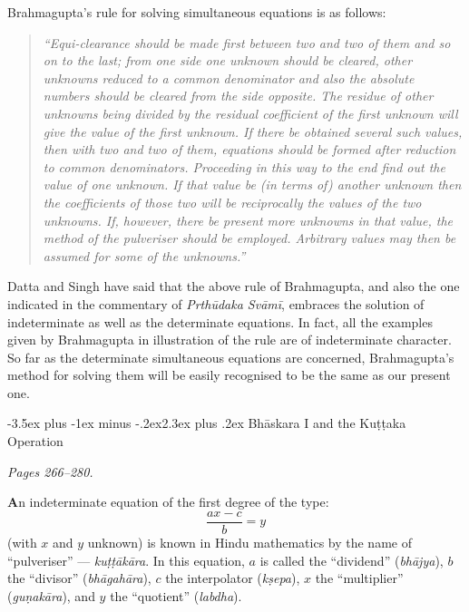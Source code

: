 \documentclass[11pt,a4paper]{article}
\makeatletter
\renewcommand{\section}{\@startsection {section}{1}{\z@}%
  {-3.5ex plus -1ex minus -.2ex}{2.3ex plus .2ex}%
  {\normalfont\Large\bfseries\color{sectioncolor}}}
\newcommand{\cnote}[1]{\textcolor{notecolor}{\textit{#1}}}
\makeatother
\begin{document}
Brahmagupta's rule for solving simultaneous equations is as follows:

\begin{quote}
\textit{``Equi-clearance should be made first between two and two of them and so on to the last; from one side one unknown should be cleared, other unknowns reduced to a common denominator and also the absolute numbers should be cleared from the side opposite. The residue of other unknowns being divided by the residual coefficient of the first unknown will give the value of the first unknown. If there be obtained several such values, then with two and two of them, equations should be formed after reduction to common denominators. Proceeding in this way to the end find out the value of one unknown. If that value be (in terms of) another unknown then the coefficients of those two will be reciprocally the values of the two unknowns. If, however, there be present more unknowns in that value, the method of the pulveriser should be employed. Arbitrary values may then be assumed for some of the unknowns.''}
\end{quote}

Datta and Singh have said that the above rule of Brahmagupta, and also the one indicated in the commentary of \textit{Prthūdaka Svāmī}, embraces the solution of indeterminate as well as the determinate equations. In fact, all the examples given by Brahmagupta in illustration of the rule are of indeterminate character. So far as the determinate simultaneous equations are concerned, Brahmagupta's method for solving them will be easily recognised to be the same as our present one.

\section{Bhāskara I and the Kuṭṭaka Operation}
\label{sec:kuttaka}

\cnote{Pages 266--280.}

\textbf{A}n indeterminate equation of the first degree of the type:
\[
\frac{ax - c}{b} = y
\]
(with $x$ and $y$ unknown) is known in Hindu mathematics by the name of ``pulveriser'' --- \textit{kuṭṭākāra}. In this equation, $a$ is called the ``dividend'' (\textit{bhājya}), $b$ the ``divisor'' (\textit{bhāgahāra}), $c$ the interpolator (\textit{kṣepa}), $x$ the ``multiplier'' (\textit{guṇakāra}), and $y$ the ``quotient'' (\textit{labdha}).
\end{document}

